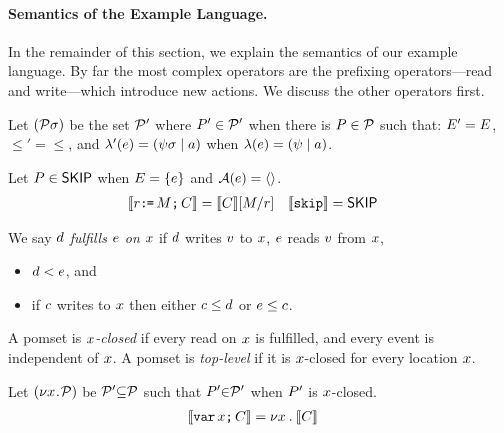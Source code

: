 \paragraph{Semantics of the Example Language.}
In the remainder of this section, we explain the semantics of our example
language.  By far the most complex operators are the prefixing
operators---read and write---which introduce new actions.  We discuss
the other operators first.


\begin{definition}
Let $(\mathcal{P}\sigma)$ be the set $\mathcal{P}'$ where $P'\in\mathcal{P}'$ when
there is $P\in\mathcal{P}$ such that:
$E' = E$,
${\le'} = {\le}$, 
and
$\lambda'(e) = (\psi\sigma \mid a)$ when $\lambda(e) = (\psi \mid a)$.

Let $P\in\textsf{SKIP}$ when
$E = \{ e \}$ and
$\mathcal{A}(e) = \langle\rangle$.
\begin{align*}
  \llbracket r\texttt{:}\mkern-1mu\texttt{=}\,M\texttt{;}\,\allowbreak C\rrbracket & =
  \llbracket C\rrbracket[M/r] 
  &  
  \llbracket\texttt{skip}\rrbracket & =
  \textsf{SKIP}
\end{align*}
\end{definition}


\begin{definition}
  \label{def:rf}
  We say $d$ \emph{fulfills $e$ on $x$} if $d$ \externally writes
  $v$ to $x$, $e$ \externally reads $v$ from $x$,
  \begin{itemize}
  \item
    $d < e$, and
  \item
    if $c$ \externally writes to $x$ then either $c \leq d$ or $e \leq c$.
  \end{itemize}

  A pomset is \emph{$x$-closed} if every \external read on $x$ is fulfilled,
  and every event is independent of $x$.
  A pomset is \emph{top-level} if it is $x$-closed for every location
  $x$.
  
  Let $(\nu x\!\mathbin.\!\mathcal{P})$ be  $\mathcal{P}'{\subseteq}\mathcal{P}$ such that $P'{\in}\mathcal{P}'$
  when $P'$ is $x$-closed.
\begin{align*}
  \llbracket\texttt{var}\,x\texttt{;}\,\allowbreak C\rrbracket & =
  \nu x \mathbin. \llbracket C\rrbracket  
\end{align*}
\end{definition}

